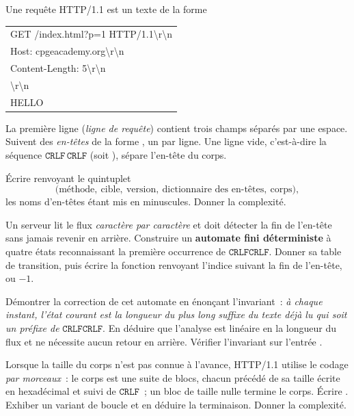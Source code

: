 \documentclass[11pt,a4paper]{article}
\begin{document}
Une requête HTTP/1.1 est un texte de la forme
\begin{center}\ttfamily\small
\begin{tabular}{l}
GET /index.html?p=1 HTTP/1.1\textbackslash r\textbackslash n\\
Host: cpgeacademy.org\textbackslash r\textbackslash n\\
Content-Length: 5\textbackslash r\textbackslash n\\
\textbackslash r\textbackslash n\\
HELLO
\end{tabular}
\end{center}
La première ligne (\emph{ligne de requête}) contient trois champs séparés par une espace.
Suivent des \emph{en-têtes} de la forme , un par ligne. Une ligne vide,
c'est-à-dire la séquence $\texttt{CRLF}\,\texttt{CRLF}$ (soit
), sépare l'en-tête du corps.

\Q Écrire  renvoyant le quintuplet
\[ \big(\text{méthode},\ \text{cible},\ \text{version},\
   \text{dictionnaire des en-têtes},\ \text{corps}\big), \]
les noms d'en-têtes étant mis en minuscules. Donner la complexité.

\Q Un serveur lit le flux \emph{caractère par caractère} et doit détecter la fin de l'en-tête
sans jamais revenir en arrière. Construire un \textbf{automate fini déterministe} à quatre
états reconnaissant la première occurrence de $\texttt{CRLFCRLF}$. Donner sa table de
transition, puis écrire la fonction \code{fin_entete(flux)} renvoyant l'indice suivant la fin
de l'en-tête, ou $-1$.

\Q Démontrer la correction de cet automate en énonçant l'invariant~: \emph{à chaque instant,
l'état courant est la longueur du plus long suffixe du texte déjà lu qui soit un préfixe de}
$\texttt{CRLFCRLF}$. En déduire que l'analyse est linéaire en la longueur du flux et ne
nécessite aucun retour en arrière. Vérifier l'invariant sur l'entrée
\code{"\\r\\n\\r\\r\\n\\r\\n"}.

\Q Lorsque la taille du corps n'est pas connue à l'avance, HTTP/1.1 utilise le codage
\emph{par morceaux}~: le corps est une suite de blocs, chacun précédé de sa taille écrite en
hexadécimal et suivi de $\texttt{CRLF}$~; un bloc de taille nulle termine le corps. Écrire
\code{decoder_chunked(s)}. Exhiber un variant de boucle et en déduire la terminaison. Donner
la complexité.
\end{document}
